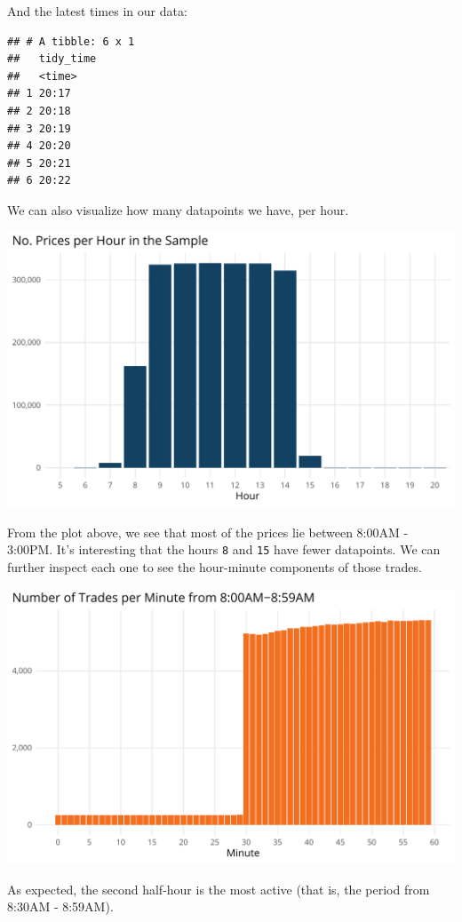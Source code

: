\documentclass[]{elsarticle} %
\makeatletter
\def\maxwidth{\ifdim\Gin@nat@width>\linewidth\linewidth
\else\Gin@nat@width\fi}
\let\Oldincludegraphics\includegraphics
\renewcommand{\includegraphics}[1]{\Oldincludegraphics[width=\maxwidth]{#1}}
\makeatother
\begin{document}
And the latest times in our data:

\begin{verbatim}
## # A tibble: 6 x 1
##   tidy_time
##   <time>   
## 1 20:17    
## 2 20:18    
## 3 20:19    
## 4 20:20    
## 5 20:21    
## 6 20:22
\end{verbatim}

We can also visualize how many datapoints we have, per hour.

\includegraphics{01-Data-Prep-Elsevier_files/figure-latex/unnamed-chunk-13-1.pdf}

From the plot above, we see that most of the prices lie between 8:00AM -
3:00PM. It's interesting that the hours \texttt{8} and \texttt{15} have
fewer datapoints. We can further inspect each one to see the hour-minute
components of those trades.

\includegraphics{01-Data-Prep-Elsevier_files/figure-latex/unnamed-chunk-14-1.pdf}

As expected, the second half-hour is the most active (that is, the
period from 8:30AM - 8:59AM).
\end{document}
